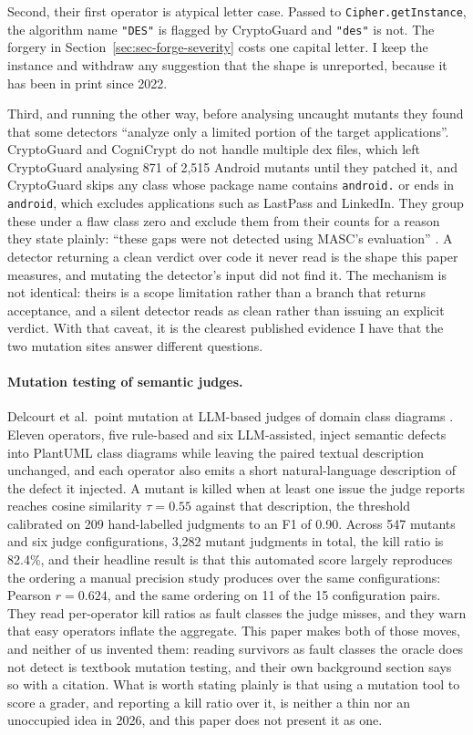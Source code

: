 \documentclass[11pt]{article}
\begin{document}
Second, their first operator is atypical letter case. Passed to
\texttt{Cipher.getInstance}, the algorithm name \texttt{"DES"} is flagged by CryptoGuard and
\texttt{"des"} is not. The forgery in Section~\ref{sec:sec-forge-severity} costs one capital
letter. I keep the
instance and withdraw any suggestion that the shape is unreported, because it has been in
print since 2022.

Third, and running the other way, before analysing uncaught mutants they found that some
detectors ``analyze only a limited portion of the target applications''. CryptoGuard and
CogniCrypt do not handle multiple dex files, which left CryptoGuard analysing 871 of 2,515
Android mutants until they patched it, and CryptoGuard skips any class whose package name
contains \texttt{android.} or ends in \texttt{android}, which excludes applications such as
LastPass and LinkedIn. They group these under a flaw class zero and exclude them from their
counts for a reason they state plainly: ``these gaps were not detected using MASC's
evaluation'' \citep{ami2022masc}. A detector returning a clean verdict over code it never
read is the shape this paper measures, and mutating the detector's input did not find it.
The mechanism is not identical: theirs is a scope limitation rather than a branch that
returns acceptance, and a silent detector reads as clean rather than issuing an explicit
verdict. With that caveat, it is the clearest published evidence I have that the two
mutation sites answer different questions.

\paragraph{Mutation testing of semantic judges.} Delcourt et al.\ point mutation at
LLM-based judges of domain class diagrams \citep{delcourt2026judge}. Eleven operators, five
rule-based and six LLM-assisted, inject semantic defects into PlantUML class diagrams while
leaving the paired textual description unchanged, and each operator also emits a short
natural-language description of the defect it injected. A mutant is killed when at least one
issue the judge reports reaches cosine similarity $\tau = 0.55$ against that description,
the threshold calibrated on 209 hand-labelled judgments to an F1 of 0.90. Across 547 mutants
and six judge configurations, 3,282 mutant judgments in total, the kill ratio is 82.4\%, and
their headline result is that this automated score largely reproduces the ordering a manual
precision study produces over the same configurations: Pearson $r = 0.624$, and the same
ordering on 11 of the 15 configuration pairs. They read per-operator kill ratios as fault
classes the judge misses, and they warn that easy operators inflate the aggregate. This
paper makes both of those moves, and neither of us invented them: reading survivors as fault
classes the oracle does not detect is textbook mutation testing, and their own background
section says so with a citation. What is worth stating plainly is that using a mutation tool
to score a grader, and reporting a kill ratio over it, is neither a thin nor an unoccupied
idea in 2026, and this paper does not present it as one.
\end{document}
